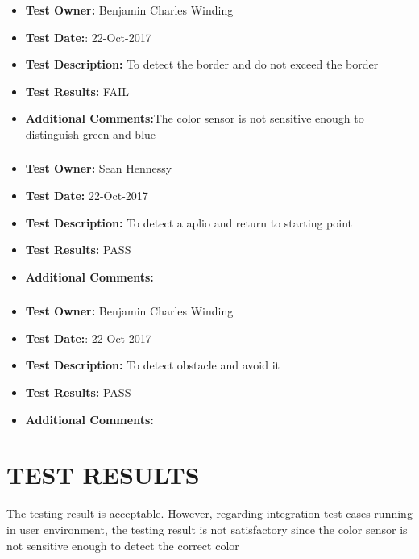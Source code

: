 \documentclass[10pt,a4paper,titlepage]{article}
\begin{document}
\subsubsection*{}
\begin{itemize}
	\item \textbf{Test Owner:} Benjamin Charles Winding
	\item \textbf{Test Date:}: 22-Oct-2017
	\item \textbf{Test Description:} To detect the border and do not exceed the border
	\item \textbf{Test Results:} FAIL
	\item \textbf{Additional Comments:}The color sensor is not sensitive enough to distinguish green and blue
\end{itemize}		

\subsubsection*{}
\begin{itemize}
	\item \textbf{Test Owner:} Sean Hennessy
	\item \textbf{Test Date:} 22-Oct-2017
	\item \textbf{Test Description:} To detect a aplio and return to starting point
	\item \textbf{Test Results:} PASS 
	\item \textbf{Additional Comments:} 
\end{itemize}

\subsubsection*{}
\begin{itemize}
	\item \textbf{Test Owner:} Benjamin Charles Winding
	\item \textbf{Test Date:}: 22-Oct-2017
	\item \textbf{Test Description:} To detect obstacle and avoid it 
	\item \textbf{Test Results:} PASS
	\item \textbf{Additional Comments:}	
\end{itemize}
	
\section{TEST RESULTS}
The testing result is acceptable. However, regarding integration test cases running in user environment, the testing result is not satisfactory since the color sensor is not sensitive enough to detect the correct color
\end{document}
